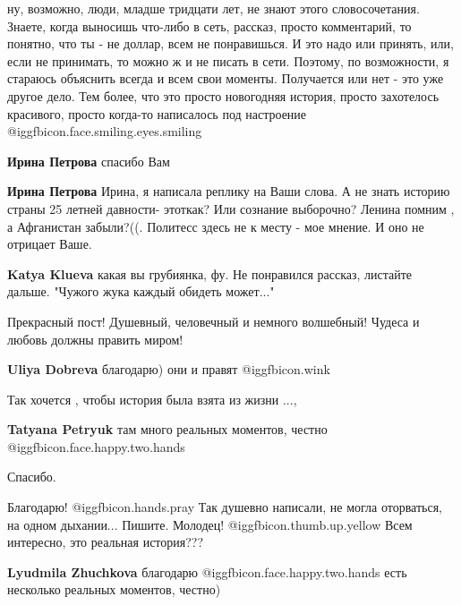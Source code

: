 \begin{itemize}
\begin{itemize}

ну, возможно, люди, младше тридцати лет, не знают этого словосочетания. Знаете,
когда выносишь что-либо в сеть, рассказ, просто комментарий, то понятно, что ты
- не доллар, всем не понравишься. И это надо или принять, или, если не
принимать, то можно ж и не писать в сети. Поэтому, по возможности, я стараюсь
объяснить всегда и всем свои моменты. Получается или нет - это уже другое дело.
Тем более, что это просто новогодняя история, просто захотелось красивого,
просто когда-то написалось под настроение @igg{fbicon.face.smiling.eyes.smiling} 

\begin{itemize} %
\textbf{Ирина Петрова} спасибо Вам

\textbf{Ирина Петрова} Ирина, я написала реплику на Ваши слова. А не знать историю страны 25 летней давности- этоткак? Или сознание выборочно? Ленина помним , а Афганистан забыли?((. Политесс здесь не к месту - мое мнение. И оно не отрицает Ваше.
\end{itemize} %

\textbf{Katya Klueva} какая вы грубиянка, фу. Не понравился рассказ, листайте дальше. "Чужого жука каждый обидеть может..."

\end{itemize} %

Прекрасный пост! Душевный, человечный и немного волшебный! Чудеса и любовь должны править миром!

\begin{itemize} %
\textbf{Uliya Dobreva} благодарю) они и правят @igg{fbicon.wink} 
\end{itemize} %

Так хочется , чтобы история была взята из жизни ...,

\textbf{Tatyana Petryuk} там много реальных моментов, честно @igg{fbicon.face.happy.two.hands} 

Спасибо.


Благодарю! @igg{fbicon.hands.pray}  Так душевно написали, не могла оторваться, на одном
дыхании... Пишите. Молодец! @igg{fbicon.thumb.up.yellow}  Всем интересно, это реальная история???

\textbf{Lyudmila Zhuchkova} благодарю @igg{fbicon.face.happy.two.hands}  есть несколько реальных моментов, честно)


\end{itemize}
